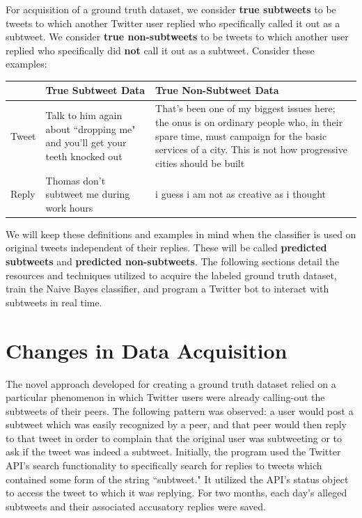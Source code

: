 \documentclass[11pt, twoside, reqno]{book}
\begin{document}
For acquisition of a ground truth dataset, we consider \textbf{true subtweets} to be tweets to which another Twitter user replied who specifically called it out as a subtweet. We consider \textbf{true non-subtweets} to be tweets to which another user replied who specifically did \textbf{not} call it out as a subtweet. Consider these examples:

\begin{center}
	\begin{tabular}{ | p{2cm} | p{5cm} | p{5cm} | }
		\hline
		& True Subtweet Data& True Non-Subtweet Data
		\\ 
		\hline
		Tweet&Talk to him again about ``dropping me" and you'll get your teeth knocked out&That's been one of my biggest issues here; the onus is on ordinary people who, in their spare time, must campaign for the basic services of a city. This is not how progressive cities should be built 
		\\ 
		\hline
		Reply&Thomas don't subtweet me during work hours&i guess i am not as creative as i thought
		\\
		\hline
	\end{tabular}
\end{center}

We will keep these definitions and examples in mind when the classifier is used on original tweets independent of their replies. These will be called \textbf{predicted subtweets} and \textbf{predicted non-subtweets}. The following sections detail the resources and techniques utilized to acquire the labeled ground truth dataset, train the Naive Bayes classifier, and program a Twitter bot to interact with subtweets in real time.

\section{Changes in Data Acquisition}
\label{changes_in_data}

The novel approach developed for creating a ground truth dataset relied on a particular phenomenon in which Twitter users were already calling-out the subtweets of their peers. The following pattern was observed: a user would post a subtweet which was easily recognized by a peer, and that peer would then reply to that tweet in order to complain that the original user was subtweeting or to ask if the tweet was indeed a subtweet. Initially, the program used the Twitter API's search functionality to specifically search for replies to tweets which contained some form of the string ``subtweet." It utilized the API's status object to access the tweet to which it was replying. For two months, each day's alleged subtweets and their associated accusatory replies were saved.
\end{document}
